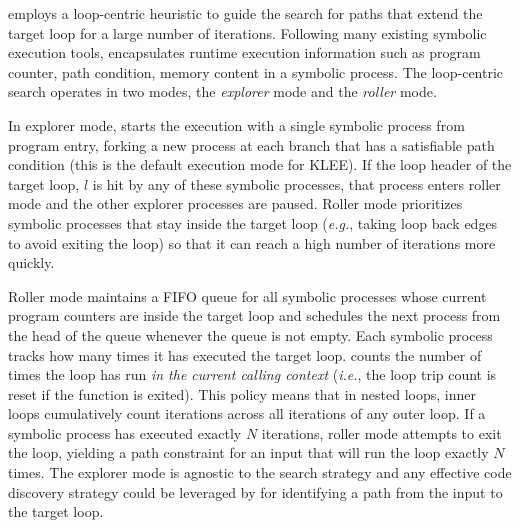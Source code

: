 \lancet employs a loop-centric heuristic to guide the search for paths that extend the target loop for a large number of iterations. Following many existing symbolic execution tools, \lancet encapsulates runtime execution information such as program counter, path condition, memory content in a symbolic process. The loop-centric search operates in two modes, the {\em explorer} mode and the {\em roller} mode. 

In explorer mode, \lancet starts the execution with a single symbolic process from program entry, forking a new process at each branch that has a satisfiable path condition (this is the default execution mode for KLEE). If the loop header of the target loop, $l$ is hit by any of these symbolic processes, that process enters roller mode and the other explorer processes are paused. Roller mode prioritizes symbolic processes that stay inside the target loop ({\em e.g.}, taking loop back edges to avoid exiting the loop) so that it can reach a high number of iterations more quickly.

Roller mode maintains a FIFO queue for all symbolic processes whose current program counters are inside the target loop and schedules the next process from the head of the queue whenever the queue is not empty.
Each symbolic process tracks how many times it has executed the target loop.
\lancet counts the number of times the loop has run {\em in the current calling context} ({\em i.e.}, the loop trip count is reset if the function is exited).
This policy means that in nested loops, inner loops cumulatively count iterations across all iterations of any outer loop. %
If a symbolic process has executed exactly $N$ iterations, roller mode attempts to exit the loop, yielding a path constraint for an input that will run the loop exactly $N$ times.
The explorer mode is agnostic to the search strategy
and any effective code discovery strategy could be leveraged by \lancet for identifying a path from the input to the target loop.

